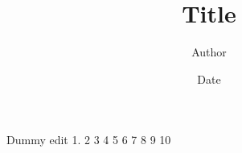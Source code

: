 \documentclass[12pt]{article}
\title{Title}
\author{Author}
\date{Date}
\begin{document}
\maketitle

Dummy edit 1. 2 3 4 5 6 7 8 9 10









\end{document}
